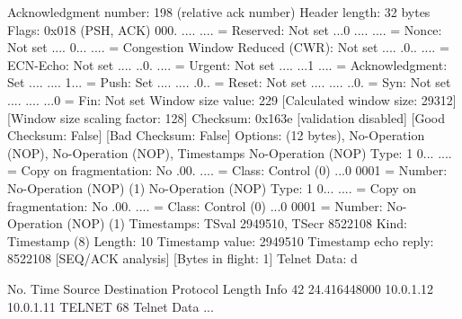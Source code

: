     Acknowledgment number: 198    (relative ack number)
    Header length: 32 bytes
    Flags: 0x018 (PSH, ACK)
        000. .... .... = Reserved: Not set
        ...0 .... .... = Nonce: Not set
        .... 0... .... = Congestion Window Reduced (CWR): Not set
        .... .0.. .... = ECN-Echo: Not set
        .... ..0. .... = Urgent: Not set
        .... ...1 .... = Acknowledgment: Set
        .... .... 1... = Push: Set
        .... .... .0.. = Reset: Not set
        .... .... ..0. = Syn: Not set
        .... .... ...0 = Fin: Not set
    Window size value: 229
    [Calculated window size: 29312]
    [Window size scaling factor: 128]
    Checksum: 0x163e [validation disabled]
        [Good Checksum: False]
        [Bad Checksum: False]
    Options: (12 bytes), No-Operation (NOP), No-Operation (NOP), Timestamps
        No-Operation (NOP)
            Type: 1
                0... .... = Copy on fragmentation: No
                .00. .... = Class: Control (0)
                ...0 0001 = Number: No-Operation (NOP) (1)
        No-Operation (NOP)
            Type: 1
                0... .... = Copy on fragmentation: No
                .00. .... = Class: Control (0)
                ...0 0001 = Number: No-Operation (NOP) (1)
        Timestamps: TSval 2949510, TSecr 8522108
            Kind: Timestamp (8)
            Length: 10
            Timestamp value: 2949510
            Timestamp echo reply: 8522108
    [SEQ/ACK analysis]
        [Bytes in flight: 1]
Telnet
    Data: d

No.     Time           Source                Destination           Protocol Length Info
     42 24.416448000   10.0.1.12             10.0.1.11             TELNET   68     Telnet Data ...

